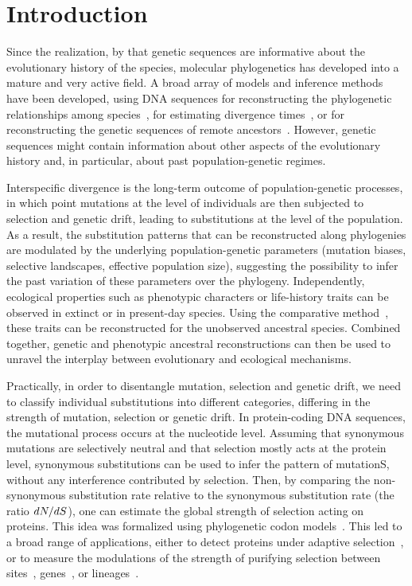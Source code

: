 \section{Introduction}
\label{sec:Introduction}

Since the realization, by \citet{Zuckerkandl1965} that genetic sequences are informative about the evolutionary history of the species, molecular phylogenetics has developed into a mature and very active field.
A broad array of models and inference methods have been developed, using DNA sequences for reconstructing the phylogenetic relationships among species~\citep{Felsenstein1981}, for estimating divergence times~\citep{Thorne2002}, or for reconstructing the genetic sequences of remote ancestors~\citep{Liberles2007}.
However, genetic sequences might contain information about other aspects of the evolutionary history and, in particular, about past population-genetic regimes.

Interspecific divergence is the long-term outcome of population-genetic processes, in which point mutations at the level of individuals are then subjected to selection and genetic drift, leading to substitutions at the level of the population.
As a result, the substitution patterns that can be reconstructed along phylogenies are modulated by the underlying population-genetic parameters (mutation biases, selective landscapes, effective population size), suggesting the possibility to infer the past variation of these parameters over the phylogeny.
Independently, ecological properties such as phenotypic characters or life-history traits can be observed in extinct or in present-day species.
Using the comparative method~\citep{Felsenstein1985}, these traits can be reconstructed for the unobserved ancestral species.
Combined together, genetic and phenotypic ancestral reconstructions can then be used to unravel the interplay between evolutionary and ecological mechanisms.

Practically, in order to disentangle mutation, selection and genetic drift, we need to classify individual substitutions into different categories, differing in the strength of mutation, selection or genetic drift.
In protein-coding \acrshort{DNA} sequences, the mutational process occurs at the nucleotide level.
Assuming that synonymous mutations are selectively neutral and that selection mostly acts at the protein level, synonymous substitutions can be used to infer the pattern of mutationS, without any interference contributed by selection.
Then, by comparing the non-synonymous substitution rate relative to the synonymous substitution rate (the ratio $dN/dS$), one can estimate the global strength of selection acting on proteins.
This idea was formalized using phylogenetic codon models~\citep{Muse1994,Goldman1994}.
This led to a broad range of applications, either to detect proteins under adaptive selection~\citep{Kosiol2008}, or to measure the modulations of the strength of purifying selection between sites~\citep{Echave2016}, genes~\citep{Zhang2015}, or lineages~\citep{Lartillot2011}.

